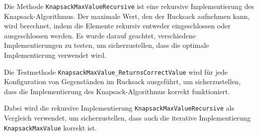 Die Methode \texttt{KnapsackMaxValueRecursive} ist eine rekursive Implementierung des Knapsack-Algorithmus. Der maximale Wert, den
der Rucksack aufnehmen kann, wird berechnet, indem die Elemente rekursiv entweder eingeschlossen oder ausgeschlossen werden.
Es wurde darauf geachtet, verschiedene Implementierungen zu testen, um sicherzustellen, dass die optimale Implementierung verwendet wird.

Die Testmethode \texttt{KnapsackMaxValue\_ReturnsCorrectValue} wird für jede Konfiguration von Gegenständen im Rucksack ausgeführt,
um sicherzustellen, dass die Implementierung des Knapsack-Algorithmus korrekt funktioniert.

Dabei wird die rekursive Implementierung \texttt{KnapsackMaxValueRecursive} als Vergleich verwendet, um sicherzustellen, dass
auch die iterative Implementierung \texttt{KnapsackMaxValue} korrekt ist.

